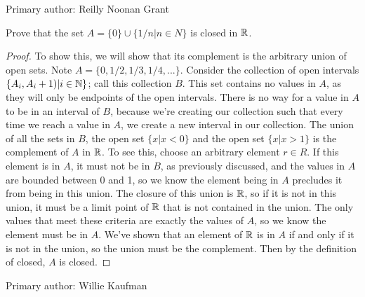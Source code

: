 Primary author: Reilly Noonan Grant

\begin{minorEx} %
Prove that the set $A = \{0\} \cup \{1/n | n \in N\}$ is closed in $\mathbb{R}$.
\end{minorEx}

\begin{proof}
To show this, we will show that its complement is the arbitrary union
of open sets. Note $A=\{0, 1/2, 1/3, 1/4, ...\}$. Consider the
collection of open intervals $\{A_i, A_i+1) | i \in \mathbb{N} \}$; call this
collection $B$. This set contains no values in $A$, as they will only
be endpoints of the open intervals. There is no way for a value in $A$
to be in an interval of $B$, because we're creating our collection
such that every time we reach a value in $A$, we create a new interval
in our collection. The union of all the sets in $B$, the open set $\{x
| x < 0\}$ and the open set $\{x | x > 1\}$ is the complement of $A$ in
$\mathbb{R}$. To see this, choose an arbitrary element $r \in R$. If this element is in $A$, it must not be in $B$, as previously discussed, and the values in $A$ are bounded between 0 and 1, so we know the element being in $A$ precludes it from being in this union. The closure of this union is $\mathbb{R}$, so if it is not in this union, it must be a limit point of $\mathbb{R}$ that is not contained in the union. The only values that meet these criteria are exactly the values of $A$, so we know the element must be in $A$. We've shown that an element of $\mathbb{R}$ is in $A$ if and only if it is not in the union, so the union must be the complement. Then by the definition of closed, $A$ is closed.
\end{proof}

Primary author: Willie Kaufman
